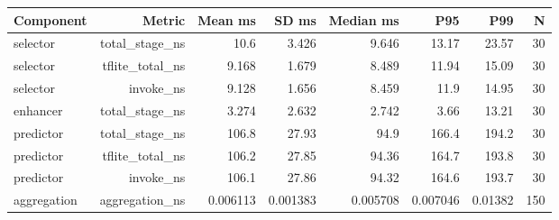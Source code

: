 \begin{tabular}{lrrrrrrr}
\toprule
Component & Metric & Mean ms & SD ms & Median ms & P95 & P99 & N \\
\midrule
selector & total\_stage\_ns & 10.6 & 3.426 & 9.646 & 13.17 & 23.57 & 30 \\
selector & tflite\_total\_ns & 9.168 & 1.679 & 8.489 & 11.94 & 15.09 & 30 \\
selector & invoke\_ns & 9.128 & 1.656 & 8.459 & 11.9 & 14.95 & 30 \\
enhancer & total\_stage\_ns & 3.274 & 2.632 & 2.742 & 3.66 & 13.21 & 30 \\
predictor & total\_stage\_ns & 106.8 & 27.93 & 94.9 & 166.4 & 194.2 & 30 \\
predictor & tflite\_total\_ns & 106.2 & 27.85 & 94.36 & 164.7 & 193.8 & 30 \\
predictor & invoke\_ns & 106.1 & 27.86 & 94.32 & 164.6 & 193.7 & 30 \\
aggregation & aggregation\_ns & 0.006113 & 0.001383 & 0.005708 & 0.007046 & 0.01382 & 150 \\
\bottomrule
\end{tabular}
